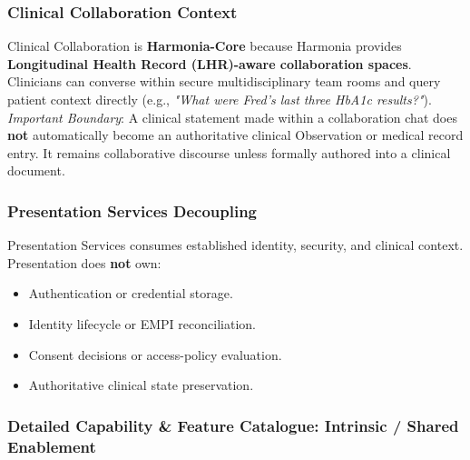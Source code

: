 \subsubsection*{Clinical Collaboration Context}
\label{rad:enabling:594}

Clinical Collaboration is \textbf{Harmonia-Core} because Harmonia provides \textbf{Longitudinal Health Record (LHR)-aware collaboration spaces}. Clinicians can converse within secure multidisciplinary team rooms and query patient context directly (e.g., \emph{"What were Fred's last three HbA1c results?"}). \emph{Important Boundary}: A clinical statement made within a collaboration chat does \textbf{not} automatically become an authoritative clinical Observation or medical record entry. It remains collaborative discourse unless formally authored into a clinical document.

\label{rad:enabling:597}
\subsubsection*{Presentation Services Decoupling}
\label{rad:enabling:598}

Presentation Services consumes established identity, security, and clinical context. Presentation does \textbf{not} own:

\label{rad:enabling:599}

\begin{itemize}

\item 
Authentication or credential storage.



\item 
Identity lifecycle or EMPI reconciliation.



\item 
Consent decisions or access-policy evaluation.



\item 
Authoritative clinical state preservation.



\end{itemize}
\label{rad:enabling:604}

\par\smallskip
{}\label{rad:enabling:606}
\subsubsection*{Detailed Capability \& Feature Catalogue: Intrinsic /\allowbreak{} Shared Enablement}
\label{rad:enabling:608}
